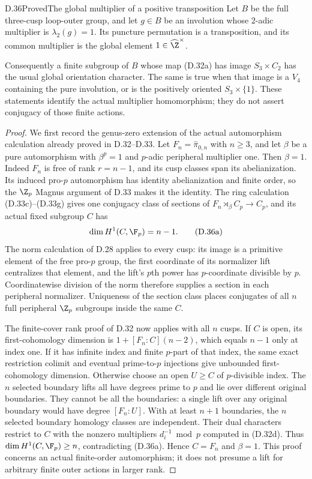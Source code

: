 \begin{claim}{D.36}{Proved}{The global multiplier of a positive transposition}
Let $B$ be the full three-cusp loop-outer group, and let
$g\in B$ be an involution whose $2$-adic multiplier is
$\lambda_2(g)=1$.  Its puncture permutation is a
transposition, and its common multiplier is the global
element $1\in\widehat\Z^\times$.

Consequently a finite subgroup of $B$ whose map (D.32a)
has image $S_3\times C_2$ has the usual global orientation
character.  The same is true when that image is a
$V_4$ containing the pure involution, or is the positively
oriented $S_3\times\{1\}$.  These statements identify
the actual multiplier homomorphism; they do not assert
conjugacy of those finite actions.
\end{claim}
\begin{proof}
We first record the genus-zero extension of the actual
automorphism calculation already proved in D.32--D.33.
Let $F_n=\widehat\pi_{0,n}$ with $n\geq3$, and let
$\beta$ be a pure automorphism with $\beta^p=1$ and
$p$-adic peripheral multiplier one.  Then $\beta=1$.
Indeed $F_n$ is free of rank $r=n-1$, and its cusp
classes span its abelianization.  Its induced pro-$p$
automorphism has identity abelianization and finite
order, so the $\Z_p$ Magnus argument of D.33 makes
it the identity.  The ring calculation (D.33c)--(D.33g)
gives one conjugacy class of sections of
$F_n\rtimes_\beta C_p\to C_p$, and its actual fixed
subgroup $C$ has
\[
                       \dim H^1(C,\F_p)=n-1.               \tag{D.36a}
\]
The norm calculation of D.28 applies to every cusp:
its image is a primitive element of the free pro-$p$
group, the first coordinate of its normalizer lift
centralizes that element, and the lift's $p$th power
has $p$-coordinate divisible by $p$.  Coordinatewise
division of the norm therefore supplies a section in
each peripheral normalizer.  Uniqueness of the
section class places conjugates of all $n$ full
peripheral $\Z_p$ subgroups inside the same $C$.

The finite-cover rank proof of D.32 now applies with
all $n$ cusps.  If $C$ is open, its first-cohomology
dimension is $1+[F_n:C](n-2)$, which equals $n-1$
only at index one.  If it has infinite index and
finite $p$-part of that index, the same exact
restriction colimit and eventual prime-to-$p$
injections give unbounded first-cohomology dimension.
Otherwise choose an open $U\geq C$ of $p$-divisible
index.  The $n$ selected boundary lifts all have
degrees prime to $p$ and lie over different original
boundaries.  They cannot be all the boundaries:
a single lift over any original boundary would
have degree $[F_n:U]$.  With at least $n+1$ boundaries,
the $n$ selected boundary homology classes are
independent.  Their dual characters restrict to
$C$ with the nonzero multipliers $d_i^{-1}\bmod p$
computed in (D.32d).  Thus $\dim H^1(C,\F_p)\geq n$,
contradicting (D.36a).  Hence $C=F_n$ and $\beta=1$.
This proof concerns an actual finite-order automorphism;
it does not presume a lift for arbitrary finite outer
actions in larger rank.


\end{proof}
